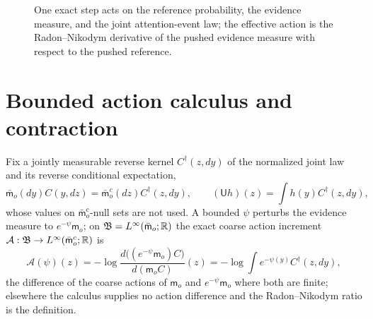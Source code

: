 \begin{figure}[htbp]
\centering
{}
\caption{One exact step acts on the reference probability, the evidence measure,
and the joint attention-event law; the effective action is the Radon--Nikodym
derivative of the pushed evidence measure with respect to the pushed reference.}
\label{fig:rg-exact-measure-flow}
\end{figure}

\section{Bounded action calculus and contraction}
\label{sec:rg-local-action-calculus}
\label{sec:rg-action-contraction}

\label{prop:rg-action-bounded-recentering}%
Fix a jointly measurable reverse kernel $C^\dagger(z,dy)$ of the normalized joint
law and its reverse conditional expectation,
\begin{equation}
\bar{\mathsf m}_o(dy)C(y,dz)=\bar{\mathsf m}_o^c(dz)C^\dagger(z,dy),
\qquad
(\mathsf Uh)(z)=\int h(y)C^\dagger(z,dy),
\label{eq:rg-normalized-reverse-kernel}
\end{equation}
whose values on $\bar{\mathsf m}_o^c$-null sets are not used. A bounded $\psi$
perturbs the evidence measure to $e^{-\psi}\mathsf m_o$; on
$\mathfrak B=L^\infty(\bar{\mathsf m}_o;\mathbb R)$ the exact coarse action increment
$\mathcal A:\mathfrak B\to L^\infty(\bar{\mathsf m}_o^c;\mathbb R)$ is
\begin{equation}
\mathcal A(\psi)(z)
=-\log\frac{d\bigl((e^{-\psi}\mathsf m_o)C\bigr)}{d(\mathsf m_oC)}(z)
=-\log\int e^{-\psi(y)}C^\dagger(z,dy),
\label{eq:rg-local-action-map}
\end{equation}
the difference of the coarse actions of $\mathsf m_o$ and $e^{-\psi}\mathsf m_o$
where both are finite; elsewhere the calculus supplies no action difference and the
Radon--Nikodym ratio is the definition.

